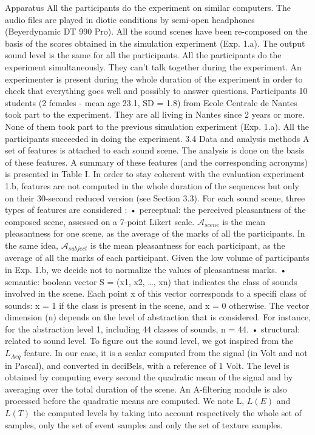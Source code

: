 Apparatus All the participants do the experiment on similar computers. The audio files are played in diotic conditions by semi-open headphones (Beyerdynamic DT 990 Pro). All the sound scenes have been re-composed on the basis of the scores obtained in the simulation experiment (Exp. 1.a). The output sound level is the same for all the participants. All the participants do the experiment simultaneously. They can’t talk together during the experiment. An experimenter is present during the whole duration of the experiment in order to check that everything goes well and possibly to answer questions.
Participants 10 students (2 females - mean age 23.1, SD = 1.8) from Ecole Centrale de Nantes took part to the experiment. They are all living in Nantes since 2 years or more. None of them took part to the previous simulation experiment (Exp. 1.a). All the participants succeeded in doing the experiment.
3.4 Data and analysis methods
A set of features is attached to each sound scene. The analysis is done on the basis of these features. A summary of these features (and the corresponding acronyms) is presented in Table I. In order to stay coherent with the evaluation experiment 1.b, features are not computed in the whole duration of the sequences but only on their 30-second reduced version (see Section 3.3). For each sound scene, three types of features are considered : • perceptual: the perceived pleasantness of the composed scene, assessed on a 7-point Likert scale. $\mathcal{A}_{scene}$ is the mean pleasantness for one scene, as the average of the marks of all the participants. In the same idea, $\mathcal{A}_{subject}$ is the mean pleasantness for each participant, as the average of all the marks of each participant. Given the low volume of participants in Exp. 1.b, we decide not to normalize the values of pleasantness marks. • semantic: boolean vector S = (x1, x2, …, xn) that indicates the class of sounds involved in the scene. Each point x of this vector corresponds to a specifi class of sounds: x = 1 if the class is present in the scene, and x = 0 otherwise. The vector dimension (n) depends on the level of abstraction that is considered. For instance, for the abstraction level 1, including 44 classes of sounds, n = 44. • structural: related to sound level. To figure out the sound level, we got inspired from the $L_{Aeq}$ feature. In our case, it is a scalar computed from the signal (in Volt and not in Pascal), and converted in deciBels, with a reference of 1 Volt. The level is obtained by computing every second the quadratic mean of the signal and by averaging over the total duration of the scene. An A-filtering module is also processed before the quadratic means are computed. We note L, $L(E)$ and $L(T)$ the computed levels by taking into account respectively the whole set of samples, only the set of event samples and only the set of texture samples.
